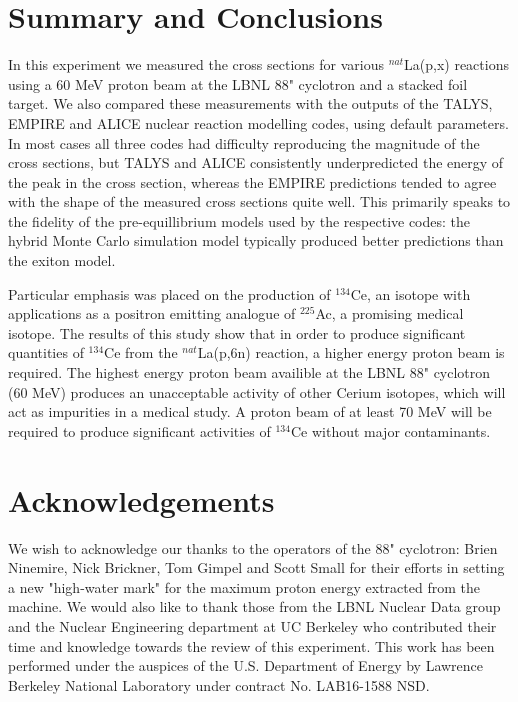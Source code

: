 \documentclass[aps,superscriptaddress,twocolumn,secnumarabic,balancelastpage,amsmath,amssymb,nofootinbib,floatfix]{revtex4-1}
\begin{document}
\section{Summary and Conclusions}
In this experiment we measured the cross sections for various $^{nat}$La(p,x) reactions using a 60 MeV proton beam at the LBNL 88" cyclotron and a stacked foil target.  We also compared these measurements with the outputs of the TALYS, EMPIRE and ALICE nuclear reaction modelling codes, using default parameters.  In most cases all three codes had difficulty reproducing the magnitude of the cross sections, but TALYS and ALICE consistently underpredicted the energy of the peak in the cross section, whereas the EMPIRE predictions tended to agree with the shape of the measured cross sections quite well.  This primarily speaks to the fidelity of the pre-equillibrium models used by the respective codes: the hybrid Monte Carlo simulation model typically produced better predictions than the exiton model.

Particular emphasis was placed on the production of $^{134}$Ce, an isotope with applications as a positron emitting analogue of $^{225}$Ac, a promising medical isotope.  The results of this study show that in order to produce significant quantities of $^{134}$Ce from the $^{nat}$La(p,6n) reaction, a higher energy proton beam is required.  The highest energy proton beam availible at the LBNL 88" cyclotron (60 MeV) produces an unacceptable activity of other Cerium isotopes, which will act as impurities in a medical study.  A proton beam of at least 70 MeV will be required to produce significant activities of $^{134}$Ce without major contaminants.

\section*{Acknowledgements}
We wish to acknowledge our thanks to the operators of the 88" cyclotron: Brien Ninemire, Nick Brickner, Tom Gimpel and Scott Small for their efforts in setting a new "high-water mark" for the maximum proton energy extracted from the machine.  We would also like to thank those from the LBNL Nuclear Data group and the Nuclear Engineering department at UC Berkeley who contributed their time and knowledge towards the review of this experiment. This work has been performed under the auspices of the U.S. Department of Energy by Lawrence Berkeley National Laboratory under contract No. LAB16-1588 NSD.



\end{document}
